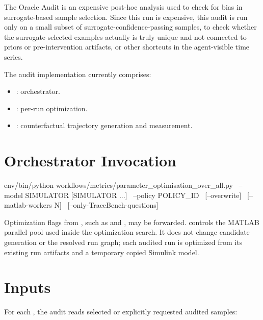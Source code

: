 \documentclass[11pt]{article}
\begin{document}
\label{docstart:oracle_audit}

The Oracle Audit is an expensive post-hoc analysis used to check for bias in surrogate-based sample selection.
Since this run is expensive, this audit is run only on a small subset of surrogate-confidence-passing samples, to check whether the surrogate-selected examples actually is truly unique and not connected to priors or pre-intervention artifacts, or other shortcuts in the agent-visible time series.

The audit implementation currently comprises:

\begin{itemize}
\item {}: orchestrator.
\item {}: per-run optimization.
\item {}: counterfactual trajectory generation and measurement.
\end{itemize}

\section*{Orchestrator Invocation}

\begin{DocCode}
env/bin/python workflows/metrics/parameter_optimisation_over_all.py \
  --model SIMULATOR [SIMULATOR ...] \
  --policy POLICY_ID \
  [--overwrite] \
  [--matlab-workers N] \
  [--only-TraceBench-questions]
\end{DocCode}

Optimization flags from , such as  and , may be forwarded.
\code{--matlab-workers} controls the MATLAB parallel pool used inside the optimization search.
It does not change candidate generation or the resolved run graph; each audited run is optimized from its existing run artifacts and a temporary copied Simulink model.

\section*{Inputs}

For each \termSimulator, the audit reads selected or explicitly requested audited samples:
\end{document}
